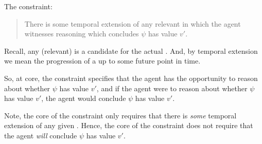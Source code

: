
\begin{note}[Constraint]
  The constraint:
  \begin{quote}
    There is some temporal extension of any relevant \epVW{} in which the agent witnesses reasoning which concludes \(\psi\) has value \(v'\).
  \end{quote}

  Recall, any (relevant) \epVW{} is a candidate for the actual \world{}.
  And, by temporal extension we mean the progression of a \world{} up to some future point in time.

  So, at core, the constraint specifies that the agent has the opportunity to reason about whether \(\psi\) has value \(v'\), and if the agent were to reason about whether \(\psi\) has value \(v'\), the agent would conclude \(\psi\) has value \(v'\).

  Note, the core of the constraint only requires that there is \emph{some} temporal extension of any given \epVW{}.
  Hence, the core of the constraint does not require that the agent \emph{will} conclude \(\psi\) has value \(v'\).
\end{note}


